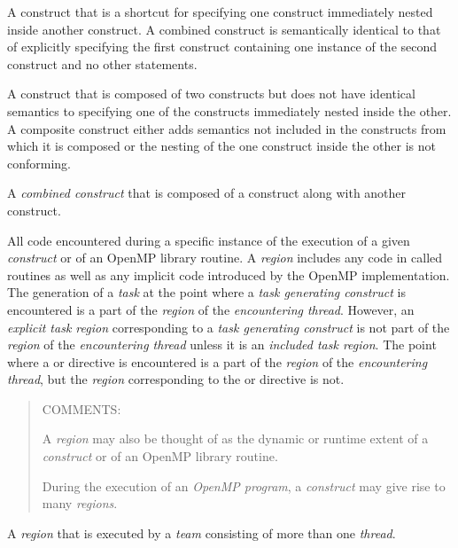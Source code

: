 \glossarydefstart
A construct that is a shortcut for specifying one construct immediately 
nested inside another construct. A combined construct is semantically 
identical to that of explicitly specifying the first construct containing 
one instance of the second construct and no other statements.
\glossarydefend

\glossarydefstart
A construct that is composed of two constructs but does not have identical 
semantics to specifying one of the constructs immediately nested inside the 
other. A composite construct either adds semantics not included in the 
constructs from which it is composed or the nesting of the one construct 
inside the other is not conforming.
\glossarydefend

\glossarydefstart
A \emph{combined construct} that is composed of a  construct 
along with another construct.
\glossarydefend


\glossarydefstart
All code encountered during a specific instance of the execution of a given
\emph{construct} or of an OpenMP library routine. A \emph{region} includes 
any code in called routines as well as any implicit code introduced by the 
OpenMP implementation. The generation of a \emph{task} at the point where 
a \emph{task generating construct} is encountered is a part of the 
\emph{region} of the \emph{encountering thread}.  However, an 
\emph{explicit task region} corresponding to a 
\emph{task generating construct} is not part of the \emph{region} of the 
\emph{encountering thread} unless it is an \emph{included task region}. 
The point where a  or  directive is encountered 
is a part of the \emph{region} of the \emph{encountering thread}, but the
\emph{region} corresponding to the  or  directive 
is not.

\begin{quote}
COMMENTS:

A \emph{region} may also be thought of as the dynamic or runtime extent of a
\emph{construct} or of an OpenMP library routine.

During the execution of an \emph{OpenMP program}, a \emph{construct} may give
rise to many \emph{regions}.
\end{quote}
\glossarydefend

\glossarydefstart
A  \emph{region} that is executed by a \emph{team} consisting 
of more than one
\emph{thread}.
\glossarydefend

